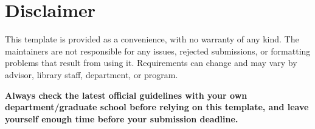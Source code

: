 \section{Disclaimer}
This template is provided as a convenience, with no warranty of any kind. The maintainers are not responsible for any issues, rejected submissions, or formatting problems that result from using it. Requirements can change and may vary by advisor, library staff, department, or program.

\textbf{Always check the latest official guidelines with your own department/graduate school before relying on this template, and leave yourself enough time before your submission deadline.}
